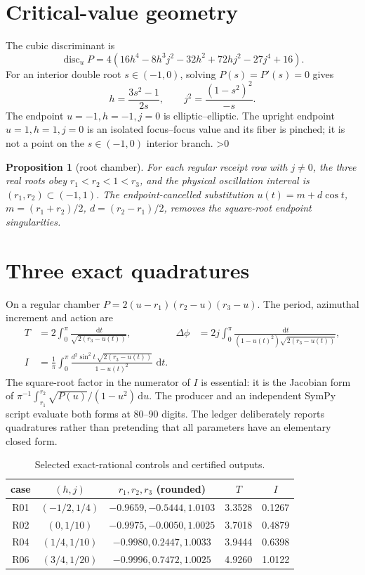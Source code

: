 \documentclass[10pt]{article}
\newtheorem{proposition}[theorem]{Proposition}
\newcommand{\dd}{\,\mathrm d}
\begin{document}
\section{Critical-value geometry}
The cubic discriminant is
\begin{equation}
\operatorname{disc}_uP=
4(16h^4-8h^3j^2-32h^2+72hj^2-27j^4+16).                   \label{eq:disc}
\end{equation}
For an interior double root \(s\in(-1,0)\), solving \(P(s)=P'(s)=0\) gives
\begin{equation}
 h=\frac{3s^2-1}{2s},\qquad j^2=\frac{(1-s^2)^2}{-s}.       \label{eq:crit}
\end{equation}
The endpoint \(u=-1,h=-1,j=0\) is elliptic--elliptic.  The upright endpoint
\(u=1,h=1,j=0\) is an isolated focus--focus value and its fiber is pinched;
it is not a point on the \(s\in(-1,0)\) interior branch.
\ifnum\CRevisionRound>0
\begin{proposition}[root chamber]\label{prop:roots}
For each regular receipt row with \(j\ne0\), the three real roots obey
\(r_1<r_2<1<r_3\), and the physical oscillation interval is
\((r_1,r_2)\subset(-1,1)\).  The endpoint-cancelled substitution
\(u(t)=m+d\cos t\), \(m=(r_1+r_2)/2\), \(d=(r_2-r_1)/2\), removes the
square-root endpoint singularities.
\end{proposition}
\fi

\section{Three exact quadratures}
On a regular chamber \(P=2(u-r_1)(r_2-u)(r_3-u)\).  The period, azimuthal
increment and action are
\begin{align}
 T&=2\int_0^\pi\frac{\dd t}{\sqrt{2(r_3-u(t))}},&
 \Delta\phi&=2j\int_0^\pi
 \frac{\dd t}{(1-u(t)^2)\sqrt{2(r_3-u(t))}},              \label{eq:q1}\\
 I&=\frac1\pi\int_0^\pi
 \frac{d^2\sin^2t\,\sqrt{2(r_3-u(t))}}{1-u(t)^2}\,\dd t . \label{eq:q2}
\end{align}
The square-root factor in the numerator of \(I\) is essential: it is the
Jacobian form of \(\pi^{-1}\int_{r_1}^{r_2}\sqrt{P(u)}/(1-u^2)\dd u\).
The producer and an independent SymPy script evaluate both forms at
80--90 digits.  The ledger deliberately reports quadratures rather than
pretending that all parameters have an elementary closed form.

\begin{table}[t]
\centering\small
\caption{Selected exact-rational controls and certified outputs.}
\begin{tabular}{c|c|c|c|c}
\toprule
case & $(h,j)$ & $r_1,r_2,r_3$ (rounded) & $T$ & $I$\\
\midrule
R01 & $(-1/2,1/4)$ & $-0.9659,-0.5444,1.0103$ & 3.3528 & 0.1267\\
R02 & $(0,1/10)$ & $-0.9975,-0.0050,1.0025$ & 3.7018 & 0.4879\\
R04 & $(1/4,1/10)$ & $-0.9980,0.2447,1.0033$ & 3.9444 & 0.6398\\
R06 & $(3/4,1/20)$ & $-0.9996,0.7472,1.0025$ & 4.9260 & 1.0122\\
\bottomrule
\end{tabular}
\end{table}
\ifnum{}
\end{document}
